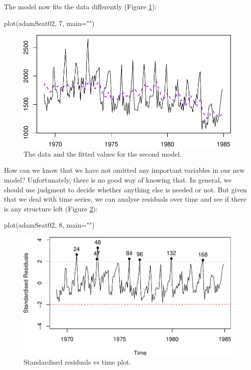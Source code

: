 \documentclass[
]{book}
\newenvironment{Shaded}{\begin{snugshade}}{\end{snugshade}}
\newcommand{\AttributeTok}[1]{\textcolor[rgb]{0.77,0.63,0.00}{#1}}
\newcommand{\DecValTok}[1]{\textcolor[rgb]{0.00,0.00,0.81}{#1}}
\newcommand{\FunctionTok}[1]{\textcolor[rgb]{0.00,0.00,0.00}{#1}}
\newcommand{\NormalTok}[1]{#1}
\newcommand{\StringTok}[1]{\textcolor[rgb]{0.31,0.60,0.02}{#1}}
\theoremstyle{definition}
\theoremstyle{definition}
\theoremstyle{definition}
\theoremstyle{definition}
\theoremstyle{remark}
\begin{document}
The model now fits the data differently (Figure \ref{fig:adamSeat02}):

\begin{Shaded}
\begin{Highlighting}[]
\FunctionTok{plot}\NormalTok{(adamSeat02, }\DecValTok{7}\NormalTok{, }\AttributeTok{main=}\StringTok{""}\NormalTok{)}
\end{Highlighting}
\end{Shaded}

\begin{figure}
\centering
\includegraphics{Svetunkov--2022----ADAM_files/figure-latex/adamSeat02-1.pdf}
\caption{\label{fig:adamSeat02}The data and the fitted values for the second model.}
\end{figure}

How can we know that we have not omitted any important variables in our new model? Unfortunately, there is no good way of knowing that. In general, we should use judgment to decide whether anything else is needed or not. But given that we deal with time series, we can analyse residuals over time and see if there is any structure left (Figure \ref{fig:adamSeat02Resid}):

\begin{Shaded}
\begin{Highlighting}[]
\FunctionTok{plot}\NormalTok{(adamSeat02, }\DecValTok{8}\NormalTok{, }\AttributeTok{main=}\StringTok{""}\NormalTok{)}
\end{Highlighting}
\end{Shaded}

\begin{figure}
\centering
\includegraphics{Svetunkov--2022----ADAM_files/figure-latex/adamSeat02Resid-1.pdf}
\caption{\label{fig:adamSeat02Resid}Standardised residuals vs time plot.}
\end{figure}
\end{document}
